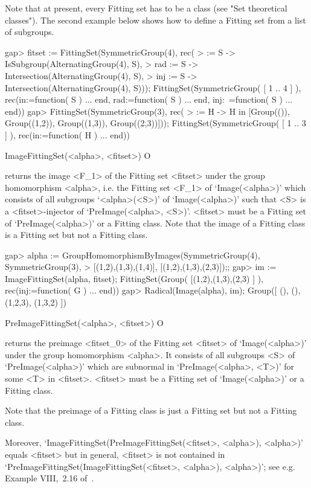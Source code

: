 Note that at present, every Fitting set has to be a class (see "Set theoretical
classes"). The second example below shows how to define a Fitting set from 
a list of subgroups.


\beginexample
gap>  fitset := FittingSet(SymmetricGroup(4), rec(
>        \in := S -> IsSubgroup(AlternatingGroup(4), S),
>        rad := S -> Intersection(AlternatingGroup(4), S),
>        inj := S -> Intersection(AlternatingGroup(4), S)));
FittingSet(SymmetricGroup( 
[ 1 .. 4 ] ), rec(in:=function( S ) ... end, rad:=function( S ) ... end, inj:\
=function( S ) ... end))
gap> FittingSet(SymmetricGroup(3), rec(
>       \in := H -> H in [Group(()), Group((1,2)), Group((1,3)), Group((2,3))]));
FittingSet(SymmetricGroup( [ 1 .. 3 ] ), rec(in:=function( H ) ... end))
\endexample

\>ImageFittingSet(<alpha>, <fitset>) O

returns the image <F_1> of the Fitting set <fitset> under the group homomorphism 
<alpha>, i.e.
the Fitting set <F_1> of `Image(<alpha>)' which consists of all subgroups
`<alpha>(<S>)' of `Image(<alpha>)' such that <S> is a <fitset>-injector of 
`PreImage(<alpha>, <S>)'. <fitset> must be a Fitting set of `PreImage(<alpha>)'
or a Fitting class.  Note that the image of a Fitting class is a
Fitting set but not a Fitting class.

\beginexample
gap> alpha := GroupHomomorphismByImages(SymmetricGroup(4), SymmetricGroup(3),
>  [(1,2),(1,3),(1,4)], [(1,2),(1,3),(2,3)]);;
gap> im := ImageFittingSet(alpha, fitset);
FittingSet(Group( [(1,2),(1,3),(2,3) 
 ] ), rec(inj:=function( G ) ... end))
gap> Radical(Image(alpha), im);
Group([ (), (), (1,2,3), (1,3,2) ])
\endexample

\>PreImageFittingSet(<alpha>, <fitset>) O

returns the preimage <fitset_0> of the Fitting set <fitset> of `Image(<alpha>)' under the group homomorphism <alpha>. It consists of all
subgroups <S> of `PreImage(<alpha>)' which are subnormal in `PreImage(<alpha>, <T>)' for some <T> in <fitset>. <fitset> must be a Fitting set of
`Image(<alpha>)' or a Fitting class. 

Note that the preimage of a Fitting class is just a Fitting set but 
not a Fitting class.

Moreover, `ImageFittingSet(PreImageFittingSet(<fitset>, <alpha>),
<alpha>)' equals <fitset> but in general, <fitset> is not contained in
`PreImageFittingSet(ImageFittingSet(<fitset>, <alpha>), <alpha>)'; see
e.g. Example VIII,~2.16 of~\cite{DH92}.

